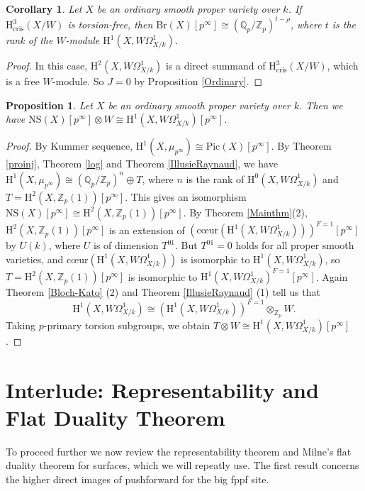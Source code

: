 \documentclass[a4paper,12pt,twoside]{report}
\newtheorem{proposition}[theorem]{Proposition}
\newtheorem{corollary}[theorem]{Corollary}
\newcommand{\Q}{\mathbb{Q}}
\newcommand{\Z}{\mathbb{Z}}
\newcommand{\cris}{\mathrm{cris}}
\newcommand{\Pic}{\mathrm{Pic}}
\newcommand{\Br}{\mathrm{Br}}
\newcommand{\NS}{\mathrm{NS}}
\newcommand{\HH}{\mathrm{H}}
\begin{document}
\begin{corollary}
Let $X$ be an ordinary smooth proper variety over $k$.
If $\HH^3_{\cris}(X/W)$ is torsion-free, 
    then $\Br(X)[p^\infty] \cong (\Q_p/\Z_p)^{t-\rho}$,
    where $t$ is the rank of the $W$-module $\HH^1(X,W\Omega^1_{X/k}).$
\end{corollary}
\begin{proof}
    In this case, $\HH^2(X,W\Omega^1_{X/k})$ is a direct summand of 
$\HH^3_{\cris}(X/W)$, which is a free $W$-module. 
So $J=0$ by Proposition \ref{Ordinary}. 
\end{proof} 
\begin{proposition}
   Let $X$ be an ordinary smooth proper variety over $k$. Then we have
$\NS(X)[p^{\infty}]\otimes W\cong \HH^1(X,W\Omega^1_{X/k})[p^{\infty}]$.
\end{proposition}
\begin{proof} By Kummer sequence, $\HH^1(X,\mu_{p^\infty})\cong \Pic(X)[p^\infty]$. 
By Theorem \ref{proinj}, Theorem \ref{log} and Theorem \ref{IllusieRaynaud},
we have $\HH^1(X,\mu_{p^\infty})\cong (\Q_p/\Z_p)^{n}\oplus T$, 
where $n$ is the rank of $\HH^0(X,W\Omega^1_{X/k})$ and $T=\HH^2(X,\Z_p(1))[p^{\infty}]$. 
This gives an isomorphism $\NS(X)[p^{\infty}]\cong \HH^2(X,\Z_p(1))[p^{\infty}]$. 
By Theorem \ref{Mainthm}(2), $\HH^2(X,\Z_p(1))[p^{\infty}]$ 
is an extension of $(\text{c\oe ur}(\HH^1(X,W\Omega^1_{X/k})))^{F=1}[p^{\infty}]$ by $U(k)$, 
where $U$ is of dimension $T^{01}$. But $T^{01}=0$ holds for all proper smooth varieties, 
and $\text{c\oe ur}(\HH^1(X,W\Omega^1_{X/k}))$ is isomorphic to $\HH^1(X,W\Omega^1_{X/k})$,  
so $T=\HH^2(X,\Z_p(1))[p^{\infty}]$ is isomorphic to $\HH^1(X,W\Omega^1_{X/k})^{F=1}[p^{\infty}]$. 
Again Theorem \ref{Bloch-Kato} (2) and Theorem \ref{IllusieRaynaud} (1) 
tell us that  \[\HH^1(X,W\Omega^1_{X/k})\cong (\HH^1(X,W\Omega^1_{X/k}))^{F=1}\otimes_{\Z_p}W.\]
Taking $p$-primary torsion subgroups, 
we obtain $T\otimes W \cong \HH^1(X,W\Omega^1_{X/k})[p^{\infty}]$. 
\end{proof} 

\medskip

\section{Interlude: Representability and Flat Duality Theorem}\label{Secrep}

To proceed further we now review the representability theorem and Milne's flat duality theorem for surfaces, which we will repeatly use. 
The first result concerns the higher direct images of pushforward for the big fppf site.
\end{document}
